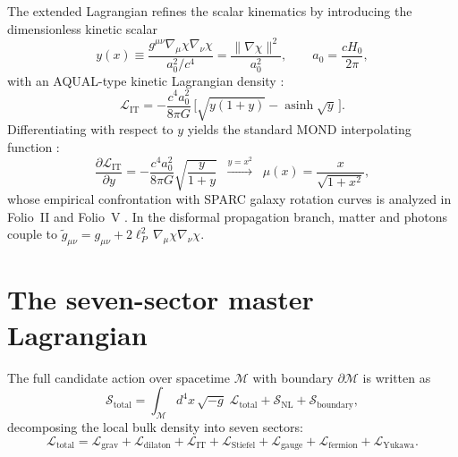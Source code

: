 \documentclass{alienfolio}
\begin{document}
The extended Lagrangian refines the scalar kinematics by introducing the
dimensionless kinetic scalar
\begin{equation}
y(x) \equiv \frac{g^{\mu\nu}\nabla_\mu\chi\nabla_\nu\chi}{a_0^2/c^4}
= \frac{\|\nabla\chi\|^2}{a_0^2}, \qquad
a_0 = \frac{cH_0}{2\pi},
\end{equation}
with an AQUAL-type kinetic Lagrangian density \cite{bekenstein_milgrom84}:
\begin{equation}
\mathcal{L}_{\mathrm{IT}}
= -\frac{c^4 a_0^2}{8\pi G}\,
\Big[\sqrt{y(1+y)} - \operatorname{asinh}\!\sqrt{y}\,\Big].
\end{equation}
Differentiating with respect to $y$ yields the standard MOND interpolating
function \cite{milgrom83}:
\begin{equation}
\frac{\partial\mathcal{L}_{\mathrm{IT}}}{\partial y}
= -\frac{c^4 a_0^2}{8\pi G}\sqrt{\frac{y}{1+y}}
\;\;\xrightarrow{y=x^2}\;\;
\mu(x) = \frac{x}{\sqrt{1+x^2}},
\end{equation}
whose empirical confrontation with SPARC galaxy rotation curves
\cite{lelli16} is analyzed in Folio~II \cite{folio-ii} and Folio~V
\cite{folio-v}. In the disformal propagation branch, matter and photons
couple to
$\tilde{g}_{\mu\nu} = g_{\mu\nu} + 2\ell_P^2\,\nabla_\mu\chi\nabla_\nu\chi$.

\section{The seven-sector master Lagrangian}
\label{sec:seven}

The full candidate action over spacetime $\mathcal{M}$ with boundary
$\partial\mathcal{M}$ is written as
\begin{equation}
\mathcal{S}_{\mathrm{total}}
= \int_{\mathcal{M}} d^4x\,\sqrt{-g}\;\mathcal{L}_{\mathrm{total}}
+ \mathcal{S}_{\mathrm{NL}} + \mathcal{S}_{\mathrm{boundary}},
\end{equation}
decomposing the local bulk density into seven sectors:
\begin{equation}
\mathcal{L}_{\mathrm{total}}
= \mathcal{L}_{\mathrm{grav}} + \mathcal{L}_{\mathrm{dilaton}}
+ \mathcal{L}_{\mathrm{IT}} + \mathcal{L}_{\mathrm{Stiefel}}
+ \mathcal{L}_{\mathrm{gauge}} + \mathcal{L}_{\mathrm{fermion}}
+ \mathcal{L}_{\mathrm{Yukawa}} .
\end{equation}
\end{document}
